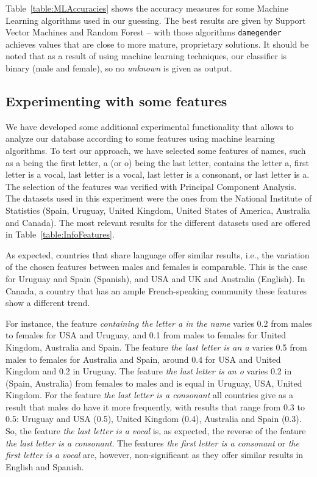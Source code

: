 \documentclass[a4paper]{article}
\begin{document}
Table~\ref{table:MLAccuracies} shows the accuracy measures for some Machine Learning algorithms used in our guessing. 
The best results are given by Support Vector Machines and Random Forest -- with those algorithms \texttt{damegender} achieves values that are close to more mature, proprietary solutions.
It should be noted that as a result of using machine learning techniques, our classifier is binary (male and female), so no \emph{unknown} is given as output.

\subsection{Experimenting with some features}

We have developed some additional experimental functionality that allows to analyze our database according to some features using machine learning algorithms.
To test our approach, we have selected some features of names, such as a being the first letter, a (or o) being the last letter, contains the letter a, first letter is a vocal, last letter is a vocal, last letter is a consonant, or last letter is a. 
The selection of the features was verified with Principal Component Analysis.
The datasets used in this experiment were the ones from the National Institute of Statistics (Spain, Uruguay, United Kingdom, United States of America, Australia and Canada).
The most relevant results for the different datasets used are offered in Table~\ref{table:InfoFeatures}.

As expected, countries that share language offer similar results, i.e., the variation of the chosen features between males and females is comparable.
This is the case for Uruguay and Spain (Spanish), and USA and UK and Australia (English).
In Canada, a country that has an ample French-speaking community these features show a different trend.

For instance, the feature \emph{containing the letter a in the name} varies 0.2 from males to females for USA and Uruguay, and 0.1 from males to females for United Kingdom, Australia and Spain.
The feature \emph{the last letter is an a} varies 0.5 from males to females for Australia and Spain, around 0.4 for USA and United Kingdom and 0.2 in
Uruguay.
The feature \emph{the last letter is an o} varies 0.2 in (Spain, Australia) from females to males and is equal in Uruguay, USA, United Kingdom.
For the feature \emph{the last letter is a consonant} all countries give as a result that males do have it more frequently, with results that range from 0.3 to 0.5: Uruguay and USA (0.5), United Kingdom (0.4), Australia and Spain (0.3). 
So, the feature \emph{the last letter is a vocal} is, as expected, the reverse of the feature \emph{the last letter is a consonant}. 
The features \emph{the first letter is a consonant} or \emph{the first letter is a vocal} are, however, non-significant as they offer similar results in English and Spanish.
\end{document}
